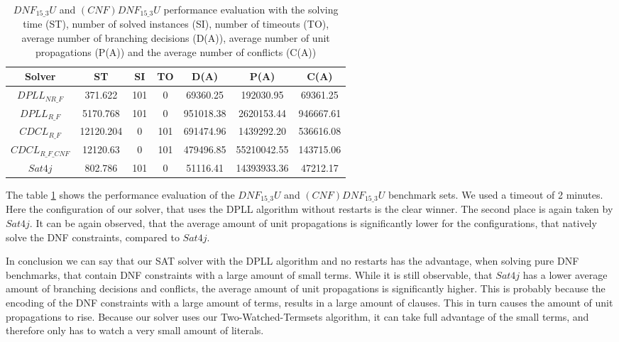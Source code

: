 \begin{table}[!htb]
\centering
\caption[$DNF_{15\_3}U$ and $(CNF)DNF_{15\_3}U$ performance evaluation]{$DNF_{15\_3}U$ and $(CNF)DNF_{15\_3}U$ performance evaluation with the solving time (ST), number of solved instances (SI), number of timeouts (TO), average number of branching decisions (D(A)), average number of unit propagations (P(A)) and the average number of conflicts (C(A))}
\label{tab:dnf153Unsat}
\begin{tabular}{|c|c|c|c|c|c|c|}
\hline
Solver & ST & SI & TO & D(A) & P(A) & C(A)\\ 
\hline
$DPLL_{NR\_F}$ & 371.622 & 101 & 0 & 69360.25 & 192030.95 & 69361.25 \\ 
\hline
$DPLL_{R\_F}$ & 5170.768 & 101 & 0 & 951018.38 & 2620153.44 & 946667.61 \\ 
\hline
$CDCL_{R\_F}$ & 12120.204 & 0 & 101 & 691474.96 & 1439292.20 & 536616.08 \\ 
\hline
$CDCL_{R\_F\_CNF}$ & 12120.63 & 0 & 101 & 479496.85 & 55210042.55 & 143715.06 \\ 
\hline
$Sat4j$ & 802.786 & 101 & 0 & 51116.41 & 14393933.36 & 47212.17 \\ 
\hline
\end{tabular}
\end{table}

The table \ref{tab:dnf153Unsat} shows the performance evaluation of the $DNF_{15\_3}U$ and $(CNF)DNF_{15\_3}U$ benchmark sets. We used a timeout of 2 minutes. Here the configuration of our solver, that uses the DPLL algorithm without restarts is the clear winner. The second place is again taken by $Sat4j$. It can be again observed, that the average amount of unit propagations is significantly lower for the configurations, that natively solve the DNF constraints, compared to $Sat4j$.

In conclusion we can say that our SAT solver with the DPLL algorithm and no restarts has the advantage, when solving pure DNF benchmarks, that contain DNF constraints with a large amount of small terms. While it is still observable, that $Sat4j$ has a lower average amount of branching decisions and conflicts, the average amount of unit propagations is significantly higher. This is probably because the encoding of the DNF constraints with a large amount of terms, results in a large amount of clauses. This in turn causes the amount of unit propagations to rise. Because our solver uses our Two-Watched-Termsets algorithm, it can take full advantage of the small terms, and therefore only has to watch a very small amount of literals.

